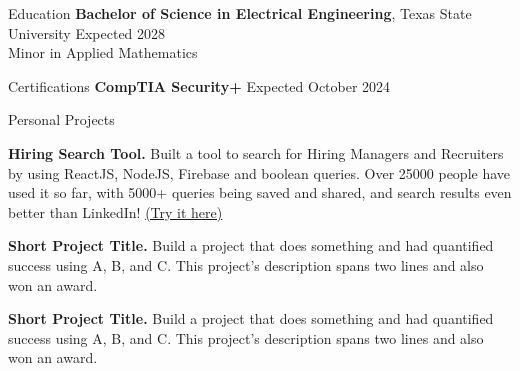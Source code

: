 \documentclass{resume} %
\begin{document}

    \begin{rSection}{Education}
        {\bf Bachelor of Science in Electrical Engineering}, Texas State University \hfill {Expected 2028} \\
        Minor in Applied Mathematics \smallskip
    \end{rSection}

    \begin{rSection}{Certifications}
        {\bf CompTIA Security+} \hfill {Expected October 2024}
    \end{rSection}

    \begin{rSection}{Personal Projects} \vspace{-1.25em}
        \item \textbf{Hiring Search Tool.} {Built a tool to search for Hiring Managers and Recruiters by using ReactJS, NodeJS, Firebase and boolean queries. Over 25000 people have used it so far, with 5000+ queries being saved and shared, and search results even better than LinkedIn! \href{https://hiring-search.careerflow.ai/}{(Try it here)}}
        \item \textbf{Short Project Title.} {Build a project that does something and had quantified success using A, B, and C. This project's description spans two lines and also won an award.}
        \item \textbf{Short Project Title.} {Build a project that does something and had quantified success using A, B, and C. This project's description spans two lines and also won an award.}
    \end{rSection} 
\end{document}
